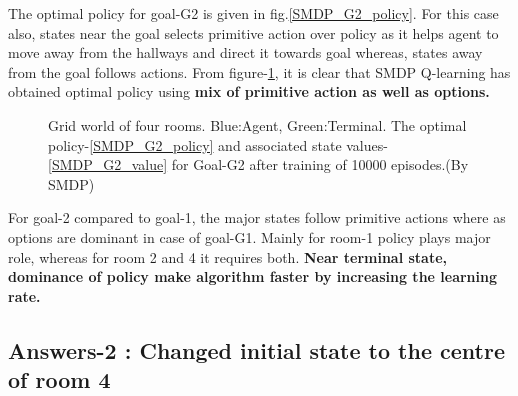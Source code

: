 \documentclass[preprint,12pt]{elsarticle}
\begin{document}
The optimal policy for goal-G2 is given in fig.\ref{SMDP_G2_policy}. For this case also, states near the goal selects primitive action over policy as it helps agent to move away from the hallways and direct it towards goal whereas, states away from the goal follows actions. From figure-\ref{fig:SMDP_G2}, it is clear that SMDP Q-learning has obtained optimal policy using \textbf{mix of primitive action as well as options.}

\begin{figure}[H]
	\centering  
	\caption{Grid world of four rooms.  Blue:Agent, Green:Terminal. The optimal policy-\ref{SMDP_G2_policy} and associated state values-\ref{SMDP_G2_value} for Goal-G2 after training of 10000 episodes.(By SMDP)}
	\label{fig:SMDP_G2}
\end{figure}
 For goal-2 compared to goal-1, the major states follow primitive actions where as options are dominant in case of goal-G1. Mainly for room-1 policy plays major role, whereas for room 2 and 4 it requires both.  \textbf{Near terminal state, dominance of policy make algorithm faster by increasing the learning rate.}

\newpage

\subsection{Answers-2 : Changed initial state to the centre of room 4}
\end{document}
